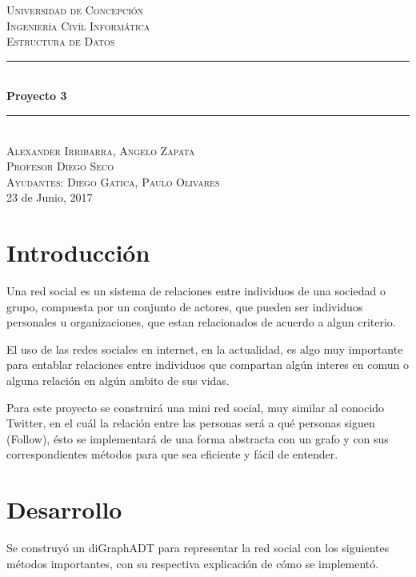 \documentclass[12pt]{article}
\begin{document}
\begin{titlepage}

\newcommand{\HRule}{\rule{\linewidth}{0.5mm}}

\center

\textsc{\LARGE Universidad de Concepci\'on}\\[1.5cm] 
\textsc{\Large Ingenier\'ia Civ\'il Inform\'atica}\\[0.5cm]
\textsc{\large Estructura de Datos}\\[2.5cm]

\HRule \\[0.4cm]
{ \huge \bfseries Proyecto 3}\\[0.4cm]
\HRule \\[3.5cm]

\textsc{\large Alexander Irribarra, Angelo Zapata}\\[0.5cm]
\textsc{Profesor Diego Seco}\\
\textsc{Ayudantes: Diego Gatica, Paulo Olivares}\\[0.5cm]
{\large 23 de Junio, 2017}\\[3cm]

\vfill 
\end{titlepage}
\tableofcontents
\newpage
\section{Introducción}
\indent\indent  Una red social es un sistema de relaciones entre individuos de una sociedad o grupo, compuesta por un conjunto de actores, que pueden ser individuos personales u organizaciones, que estan relacionados de acuerdo a algun criterio.

El uso de las redes sociales en internet, en la actualidad, es algo muy importante para entablar relaciones entre individuos que compartan algún interes en comun o alguna relación en algún ambito de sus vidas.

Para este proyecto se construirá una mini red social, muy similar al conocido Twitter, en el cuál la relación entre las personas será a qué personas siguen (Follow), ésto se implementará de una forma abstracta con un grafo y con sus correspondientes métodos para que sea eficiente y fácil de entender.
\newpage
\section{Desarrollo}

\indent\indent Se construyó un diGraphADT para representar la red social con los siguientes métodos importantes, con su respectiva explicación de cómo se implementó.
\end{document}
